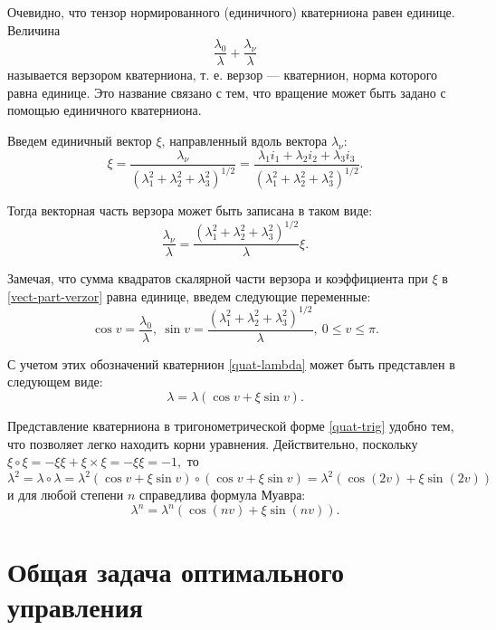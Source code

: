 \documentclass[14pt]{extreport}
\begin{document}
Очевидно, что тензор нормированного (единичного) кватерниона равен единице. Величина
$$\dfrac{\lambda_{0}}{\lambda} + \dfrac{\lambda_{\nu}}{\lambda}$$
называется верзором кватерниона, т. е. верзор — кватернион, норма которого равна единице. Это название связано с тем, что вращение может быть задано с помощью единичного кватерниона.

Введем единичный вектор $\xi$, направленный вдоль вектора $\lambda_{\nu}$:
\begin{equation}
\xi=\dfrac{\lambda_{\nu}}{(\lambda_{1}^{2}+\lambda_{2}^{2}+\lambda_{3}^{2})^{1/2}}=\dfrac{\lambda_{1}i_{1} + \lambda_{2}i_{2} + \lambda_{3}i_{3}}{(\lambda_{1}^{2}+\lambda_{2}^{2}+\lambda_{3}^{2})^{1/2}}.
\end{equation}

Тогда векторная часть верзора может быть записана в таком виде:
\begin{equation}
\label{vect-part-verzor}
\dfrac{\lambda_{\nu}}{\lambda}=\dfrac{(\lambda_{1}^{2}+\lambda_{2}^{2}+\lambda_{3}^{2})^{1/2}}{\lambda}\xi.
\end{equation}

Замечая, что сумма квадратов скалярной части верзора и коэффициента при $\xi$ в \eqref{vect-part-verzor} равна единице, введем следующие переменные:
\begin{equation}
\cos v=\dfrac{\lambda_{0}}{\lambda},\ \sin v=\dfrac{(\lambda_{1}^{2}+\lambda_{2}^{2}+\lambda_{3}^{2})^{1/2}}{\lambda},\ 0\leq v \leq \pi.
\end{equation}

С учетом этих обозначений кватернион \eqref{quat-lambda} может быть представлен в следующем виде:
\begin{equation}
\label{quat-trig}
\lambda=\lambda(\cos v + \xi \sin v).
\end{equation}

Представление кватерниона в тригонометрической форме \eqref{quat-trig} удобно тем, что позволяет легко находить корни уравнения. Действительно, поскольку $\xi \circ \xi = -\xi \xi + \xi \times \xi = -\xi \xi = -1,$ то
\begin{equation}
\lambda^{2}=\lambda \circ \lambda = \lambda^{2}(\cos v + \xi \sin v) \circ (\cos v + \xi \sin v) = \lambda^{2}(\cos (2v)+\xi \sin(2v))
\end{equation}
и для любой степени $n$ справедлива формула Муавра:
\begin{equation}
\lambda^{n}=\lambda^{n}(\cos(nv)+\xi\sin(nv)).
\end{equation}
\chapter{Общая задача оптимального управления}
\end{document}
